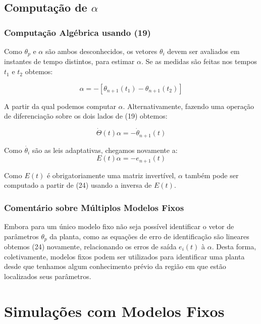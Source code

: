 \documentclass[aspectratio=169]{beamer}
\begin{document}
\subsection{Computação de $\alpha$}
\begin{frame}
\frametitle{Computação Algébrica usando (19)}
Como $\theta_p$ e $\alpha$ são ambos desconhecidos, os vetores $\theta_i$ devem ser avaliados em instantes de tempo distintos, para estimar $\alpha$. Se as medidas são feitas nos tempos $t_1$ e $t_2$ obtemos:

\begin{equation}
[\Theta(t_1)-\Theta(t_2)]\alpha =-[\theta_{n+1}(t_1) - \theta_{n+1}(t_2)]
\end{equation}

A partir da qual podemos computar $\alpha$. Alternativamente, fazendo uma operação de diferenciação sobre os dois lados de (19) obtemos:

\begin{equation}
\dot{\Theta}(t)\alpha = -\dot{\theta}_{n+1}(t)
\end{equation}

\end{frame}

\begin{frame}
Como $\dot{\theta_i}$ são as leis adaptativas, chegamos novamente a:
\begin{equation}
E(t)\alpha = -e_{n+1}(t)
\end{equation}

Como $E(t)$ é obrigatoriamente uma matriz invertível, $\alpha$ também pode ser computado a partir de (24) usando a inversa de $E(t)$.  

\end{frame}

\begin{frame}
\frametitle{Comentário sobre Múltiplos Modelos Fixos}

Embora para um único modelo fixo não seja possível identificar o vetor de parâmetros $\theta_p$ da planta, como as equações de erro de identificação são lineares obtemos (24) novamente, relacionando os erros de saída $e_i(t)$ à $\alpha$. Desta forma, coletivamente, modelos fixos podem ser utilizados para identificar uma planta desde que tenhamos algum conhecimento prévio da região em que estão localizados seus parâmetros.
 
\end{frame}


\section{Simulações com Modelos Fixos}
\end{document}

